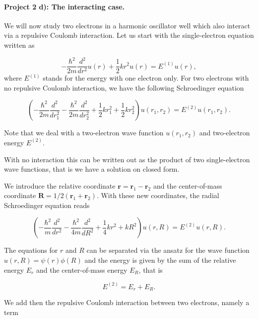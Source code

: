 \documentclass[%
oneside,                 %
final,                   %
10pt]{article}
\begin{document}
\paragraph{Project 2 d): The interacting case.}
We will now study two electrons in a harmonic oscillator well which
also interact via a repulsive Coulomb interaction.
Let us start with the single-electron equation written as

\begin{equation*}
  -\frac{\hbar^2}{2 m} \frac{d^2}{dr^2} u(r) 
       + \frac{1}{2}k r^2u(r)  = E^{(1)} u(r),
\end{equation*}
where $E^{(1)}$ stands for the energy with one electron only.
For two electrons with no repulsive Coulomb interaction, we have the following 
Schroedinger equation

\begin{equation*}
\left(  -\frac{\hbar^2}{2 m} \frac{d^2}{dr_1^2} -\frac{\hbar^2}{2 m} \frac{d^2}{dr_2^2}+ \frac{1}{2}k r_1^2+ \frac{1}{2}k r_2^2\right)u(r_1,r_2)  = E^{(2)} u(r_1,r_2) .
\end{equation*}


Note that we deal with a two-electron wave function $u(r_1,r_2)$ and 
two-electron energy $E^{(2)}$.

With no interaction this can be written out as the product of two
single-electron wave functions, that is we have a solution on closed form.

We introduce the relative coordinate $\mathbf{r} = \mathbf{r}_1-\mathbf{r}_2$
and the center-of-mass coordinate $\mathbf{R} = 1/2(\mathbf{r}_1+\mathbf{r}_2)$.
With these new coordinates, the radial Schroedinger equation reads

\begin{equation*}
\left(  -\frac{\hbar^2}{m} \frac{d^2}{dr^2} -\frac{\hbar^2}{4 m} \frac{d^2}{dR^2}+ \frac{1}{4} k r^2+  kR^2\right)u(r,R)  = E^{(2)} u(r,R).
\end{equation*}

The equations for $r$ and $R$ can be separated via the ansatz for the 
wave function $u(r,R) = \psi(r)\phi(R)$ and the energy is given by the sum
of the relative energy $E_r$ and the center-of-mass energy $E_R$, that
is

\begin{equation*}
E^{(2)}=E_r+E_R.
\end{equation*}

We add then the repulsive Coulomb interaction between two electrons,
namely a term
\end{document}
